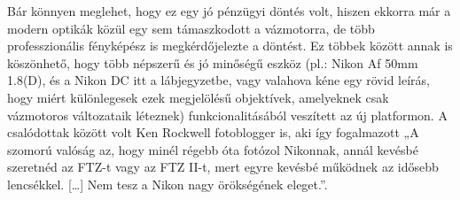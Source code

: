 Bár könnyen meglehet, hogy ez egy jó pénzügyi döntés volt, hiszen ekkorra már a modern optikák közül egy sem támaszkodott a vázmotorra, de több professzionális fényképész is megkérdőjelezte a döntést. Ez többek között annak is köszönhető, hogy több népszerű és jó minőségű eszköz (pl.: Nikon Af 50mm 1.8(D), és a Nikon DC {itt a lábjegyzetbe, vagy valahova kéne egy rövid leírás, hogy miért különlegesek ezek} megjelölésű objektívek, amelyeknek csak vázmotoros változataik léteznek) funkcionalitásából veszített az új platformon. A csalódottak között volt Ken Rockwell fotoblogger is, aki így fogalmazott „A szomorú valóság az, hogy minél régebb óta fotózol Nikonnak, annál kevésbé szeretnéd az FTZ-t vagy az FTZ II-t, mert egyre kevésbé működnek az idősebb lencsékkel. […] Nem tesz a Nikon nagy örökségének eleget.”\cite{Nikon_FTZ_Review}.